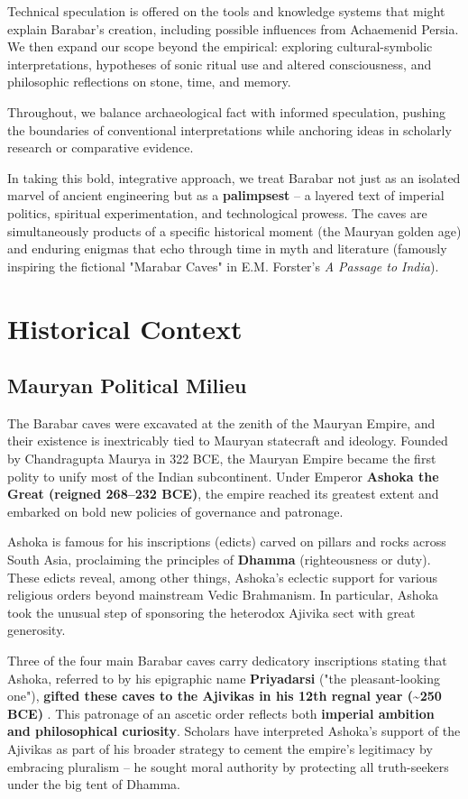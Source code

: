 \documentclass[11pt]{article}
\begin{document}
Technical speculation is offered on the tools and knowledge systems that might explain Barabar's creation, including possible influences from Achaemenid Persia. We then expand our scope beyond the empirical: exploring cultural-symbolic interpretations, hypotheses of sonic ritual use and altered consciousness, and philosophic reflections on stone, time, and memory. 

Throughout, we balance archaeological fact with informed speculation, pushing the boundaries of conventional interpretations while anchoring ideas in scholarly research or comparative evidence.

In taking this bold, integrative approach, we treat Barabar not just as an isolated marvel of ancient engineering but as a \textbf{palimpsest} -- a layered text of imperial politics, spiritual experimentation, and technological prowess. The caves are simultaneously products of a specific historical moment (the Mauryan golden age) and enduring enigmas that echo through time in myth and literature (famously inspiring the fictional "Marabar Caves" in E.M. Forster's \textit{A Passage to India}).

\section{Historical Context}

\subsection{Mauryan Political Milieu}

The Barabar caves were excavated at the zenith of the Mauryan Empire, and their existence is inextricably tied to Mauryan statecraft and ideology. Founded by Chandragupta Maurya in 322 BCE, the Mauryan Empire became the first polity to unify most of the Indian subcontinent. Under Emperor \textbf{Ashoka the Great (reigned 268--232 BCE)}, the empire reached its greatest extent and embarked on bold new policies of governance and patronage.

Ashoka is famous for his inscriptions (edicts) carved on pillars and rocks across South Asia, proclaiming the principles of \textbf{Dhamma} (righteousness or duty). These edicts reveal, among other things, Ashoka's eclectic support for various religious orders beyond mainstream Vedic Brahmanism. In particular, Ashoka took the unusual step of sponsoring the heterodox Ajivika sect with great generosity.

Three of the four main Barabar caves carry dedicatory inscriptions stating that Ashoka, referred to by his epigraphic name \textbf{Priyadarsi} ("the pleasant-looking one"), \textbf{gifted these caves to the Ajivikas in his 12th regnal year (\textasciitilde 250 BCE)} \cite{Ashoka1961}. This patronage of an ascetic order reflects both \textbf{imperial ambition and philosophical curiosity}. Scholars have interpreted Ashoka's support of the Ajivikas as part of his broader strategy to cement the empire's legitimacy by embracing pluralism -- he sought moral authority by protecting all truth-seekers under the big tent of Dhamma.
\end{document}
